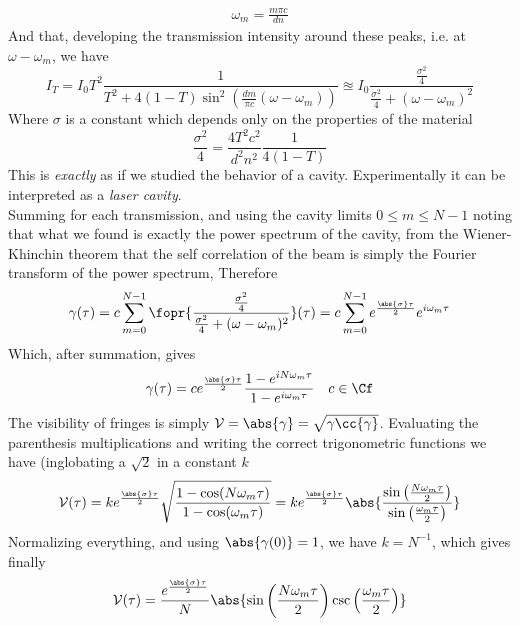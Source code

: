 \documentclass[../electromagnetism.tex]{subfiles}
\begin{document}
\begin{equation*}
	\begin{aligned}
		\omega_m=\frac{m\pi c}{dn}
	\end{aligned}
\end{equation*}
And that, developing the transmission intensity around these peaks, i.e. at $\omega-\omega_m$, we have
\begin{equation}
	I_T=I_0T^2\frac{1}{T^2+4(1-T)\sin^2\left( \frac{dm}{\pi c}(\omega-\omega_m) \right)}\approxeq I_0\frac{\frac{\sigma^2}{4}}{\frac{\sigma^2}{4}+(\omega-\omega_m)^2}
	\label{eq:transintdifffreq.mbi}
\end{equation}
Where $\sigma$ is a constant which depends only on the properties of the material
\begin{equation*}
	\frac{\sigma^2}{4}=\frac{4T^2c^2}{d^2n^2}\frac{1}{4(1-T)}
\end{equation*}
This is \textit{exactly} as if we studied the behavior of a cavity. Experimentally it can be interpreted as a \textit{laser cavity}.\\
Summing for each transmission, and using the cavity limits $0\le m\le N-1$ noting that what we found is exactly the power spectrum of the cavity, from the Wiener-Khinchin theorem that the self correlation of the beam is simply the Fourier transform of the power spectrum, Therefore
\begin{equation*}
	\gamma(\tau)=c\sum_{m=0}^{N-1}\fopr{\frac{\frac{\sigma^2}{4}}{\frac{\sigma^2}{4}+(\omega-\omega_m)^2}}(\tau)=c\sum^{N-1}_{m=0}e^{\frac{\abs{\sigma}\tau}{2}}e^{i\omega_m\tau}
\end{equation*}
Which, after summation, gives
\begin{equation}
	\gamma(\tau)=ce^{\frac{\abs{\sigma}\tau}{2}}\frac{1-e^{iN\omega_m\tau}}{1-e^{i\omega_m\tau}}\quad c\in\Cf
	\label{eq:selfcorrlasercavity.mbi}
\end{equation}
The visibility of fringes is simply $\mathcal{V}=\abs{\gamma}=\sqrt{\gamma\cc{\gamma}}$. Evaluating the parenthesis multiplications and writing the correct trigonometric functions we have (inglobating a $\sqrt{2}$ in a constant $k$
\begin{equation}
	\mathcal{V}(\tau)=ke^{\frac{\abs{\sigma}\tau}{2}}\sqrt{\frac{1-\cos(N\omega_m\tau)}{1-\cos(\omega_m\tau)}}=ke^{\frac{\abs{\sigma}\tau}{2}}\abs{\frac{\sin\left( \frac{N\omega_m\tau}{2} \right)}{\sin\left( \frac{\omega_m\tau}{2} \right)}}
	\label{eq:visnonnorm.mbi}
\end{equation}
Normalizing everything, and using $\abs{\gamma(0)}=1$, we have $k=N^{-1}$, which gives finally
\begin{equation}
	\mathcal{V}(\tau)=\frac{e^{\frac{\abs{\sigma}\tau}{2}}}{N}\abs{\sin\left( \frac{N\omega_m\tau}{2} \right)\csc\left( \frac{\omega_m\tau}{2} \right)}
	\label{eq:visibilitylasercavity.mbi}
\end{equation}
\end{document}
